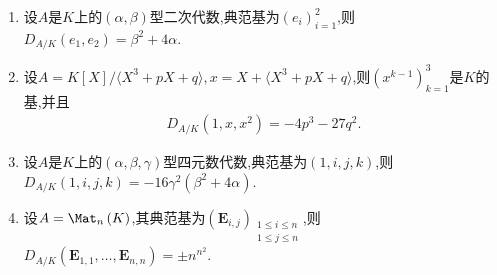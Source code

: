 \begin{example}{}{}
	\begin{enumerate}
		\item 设$A$是$K$上的$\left(\alpha,\beta\right)$型二次代数,典范基为$\left(e_{i}\right)_{i=1}^{2}$,则$D_{A/K}\left(e_{1},e_{2}\right)=\beta^{2}+4\alpha$.
		\item 设$A=K\left[X\right]/\langle X^{3}+pX+q\rangle,x=X+\langle X^{3}+pX+q\rangle$,则$\left(x^{k-1}\right)_{k=1}^{3}$是$K$的基,并且
		\begin{align*}
			D_{A/K}\left(1,x,x^{2}\right)=-4p^{3}-27q^{2}.
		\end{align*}
		\item 设$A$是$K$上的$\left(\alpha,\beta,\gamma\right)$型四元数代数,典范基为$\left(1,i,j,k\right)$,则$D_{A/K}\left(1,i,j,k\right)=-16\gamma^{2}\left(\beta^{2}+4\alpha\right)$.
		\item 设$A=\Mat_{n}\left(K\right)$,其典范基为$\left(\boldsymbol{E}_{i,j}\right)_{\substack{1\leq i\leq n\\1\leq j\leq n}}$,则$D_{A/K}\left(\boldsymbol{E}_{1,1},\ldots,\boldsymbol{E}_{n,n}\right)=\pm n^{n^{2}}$.
	\end{enumerate}
\end{example}









































